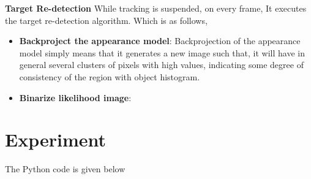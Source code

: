 \documentclass[11pt,a4paper]{article}
\begin{document}
	\textbf{Target Re-detection}\newline
	While tracking is suspended, on every frame, It executes the target re-detection algorithm. Which is as follows,
	\begin{itemize}
		\item \textbf{Backproject the appearance model}: Backprojection of the appearance model simply means that it generates a new image such that, it will have in general several clusters of pixels with high values, indicating some degree of consistency of the region with object histogram.
		\item \textbf{Binarize likelihood image}: 
	\end{itemize} 
	
	\section{Experiment}
	The Python code is given below
	
  	
\end{document}
